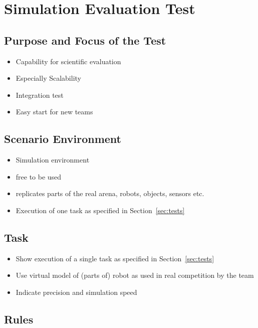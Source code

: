 \newpage
\section{Simulation Evaluation Test}

\subsection{Purpose and Focus of the Test}

\begin{itemize}
  \item Capability for scientific evaluation
  \item Especially Scalability 
  \item Integration test
  \item Easy start for new teams
\end{itemize}

\subsection{Scenario Environment}

\begin{itemize}
  \item Simulation environment
  \item free to be used
  \item replicates parts of the real arena, robots, objects, sensors etc.
  \item Execution of one task as specified in Section~\ref{sec:tests}
\end{itemize}

\subsection{Task}

\begin{itemize}
  \item Show execution of a single task as specified in Section~\ref{sec:tests}
  \item Use virtual model of (parts of) robot as used in real competition by the team
  \item Indicate precision and simulation speed
\end{itemize}

\subsection{Rules}

